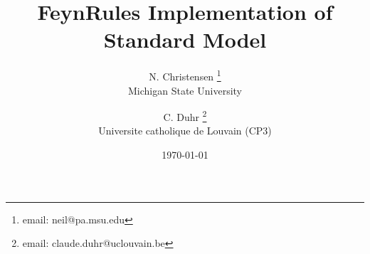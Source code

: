 \title{FeynRules Implementation of Standard Model}
\author{
	N. Christensen
		\thanks{email: neil@pa.msu.edu}
		\\Michigan State University
	\and
	C. Duhr
		\thanks{email: claude.duhr@uclouvain.be}
		\\Universite catholique de Louvain (CP3)
}
\date{\today}
